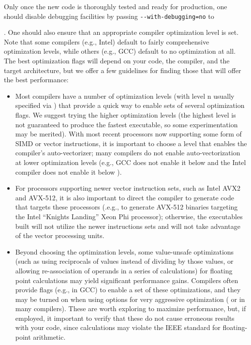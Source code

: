 {{Only once the new code is thoroughly tested and ready for production, one should disable debugging facilities by passing
\lstinline|--with-debugging=no| to {.
One should also ensure that an appropriate compiler optimization level is set.
Note that some compilers (e.g., Intel) default to fairly comprehensive optimization levels, while others (e.g., GCC) default to no
optimization at all.
The best optimization flags will depend on your code, the compiler, and the target architecture, but we offer a few guidelines for
finding those that will offer the best performance:
\begin{itemize}
\item Most compilers have a number of optimization levels (with level n usually specified via ) that provide a quick way
  to enable sets of several optimization flags.
  We suggest trying the higher optimization levels (the highest level is not guaranteed to produce the fastest executable,
  so some experimentation may be merited).
  With most recent processors now supporting some form of SIMD or vector instructions, it is important to choose a level that
  enables the compiler's auto-vectorizer; many compilers do not enable auto-vectorization at lower optimization levels
  (e.g., GCC does not enable it below  and the Intel compiler does not enable it below ).
\item For processors supporting newer vector instruction sets, such as Intel AVX2 and AVX-512, it is also important to direct the
compiler to generate code that targets these processors (.e.g.,  to generate AVX-512 binaries targeting the
Intel ``Knights Landing'' Xeon Phi processor);
otherwise, the executables built will not utilize the newer instructions sets and will not take advantage of the vector processing units.
\item Beyond choosing the optimization levels, some value-unsafe optimizations (such as using reciprocals of values instead of dividing
by those values, or allowing re-association of operands in a series of calculations) for floating point calculations may yield
significant performance gains. Compilers often provide flags (e.g.,  in GCC) to enable a set of these optimizations,
and they may be turned on when using options for very aggressive optimization ( or  in many compilers).
These are worth exploring to maximize performance, but, if employed, it important to verify that these do not cause erroneous results
with your code, since calculations may violate the IEEE standard for floating-point arithmetic.
\end{itemize}



}}}
